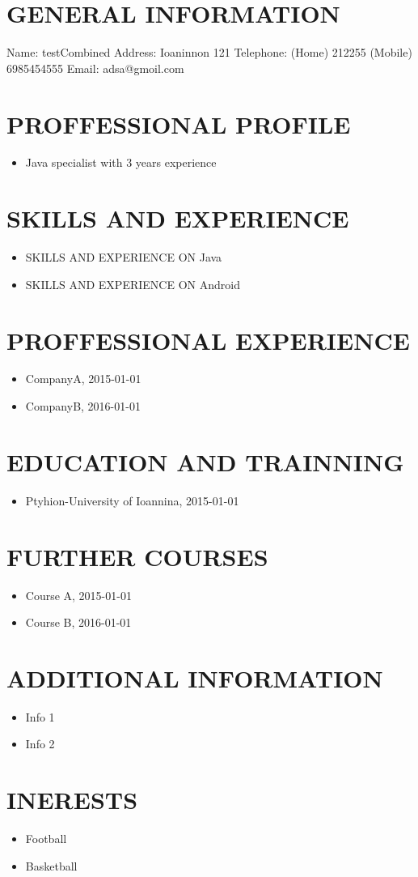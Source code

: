 \documentclass{article}
\begin{document}
 
\section{GENERAL INFORMATION}
Name: testCombined
Address: Ioaninnon 121
Telephone: (Home) 212255 (Mobile) 6985454555
Email: adsa@gmoil.com
\section{PROFFESSIONAL PROFILE}
\begin{itemize}
\item Java specialist with 3 years experience
\end{itemize}
\section{SKILLS AND EXPERIENCE}
\begin{itemize}
\item SKILLS AND EXPERIENCE ON Java
\item SKILLS AND EXPERIENCE ON Android
\end{itemize}
\section{PROFFESSIONAL EXPERIENCE}
\begin{itemize}
\item CompanyA, 2015-01-01
\item CompanyB, 2016-01-01
\end{itemize}
\section{EDUCATION AND TRAINNING}
\begin{itemize}
\item Ptyhion-University of Ioannina, 2015-01-01
\end{itemize}
\section{FURTHER COURSES}
\begin{itemize}
\item Course A, 2015-01-01
\item Course B, 2016-01-01
\end{itemize}
\section{ADDITIONAL INFORMATION}
\begin{itemize}
\item Info 1
\item Info 2
\end{itemize}
\section{INERESTS}
\begin{itemize}
\item Football
\item Basketball
\end{itemize}
\end{document}
